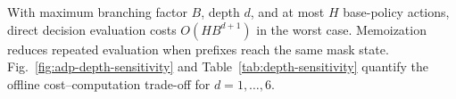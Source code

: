 \documentclass{IEEEtaes}
\theoremstyle{remark}
\theoremstyle{plain}
\begin{document}
With maximum branching factor $B$, depth $d$, and at most $H$ base-policy actions, direct decision evaluation costs $O(HB^{d+1})$ in the worst case. Memoization reduces repeated evaluation when prefixes reach the same mask state. Fig.~\ref{fig:adp-depth-sensitivity} and Table~\ref{tab:depth-sensitivity} quantify the offline cost--computation trade-off for $d=1,\ldots,6$.








\end{document}
